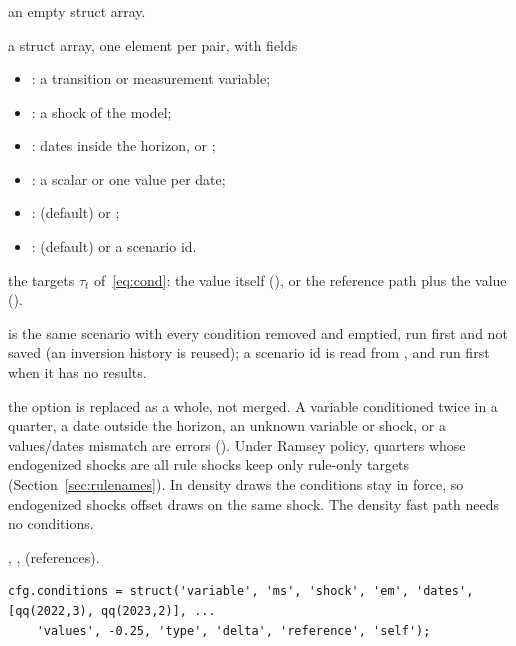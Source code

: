\documentclass[11pt,a4paper]{article}
\DeclareRobustCommand{\codem}[1]{\texttt{\detokenize{#1}}}
\newenvironment{optspec}%
  {\begin{description}[style=sameline,leftmargin=2.7cm,labelwidth=2.5cm,font=\normalfont\itshape]}%
  {\end{description}}
\begin{document}
\subsubsection{\texorpdfstring{\codem{conditions}}{conditions}}\label{opt:conditions}
\begin{optspec}
  \item[Default] an empty struct array.
  \item[Values] a struct array, one element per pair, with fields
        \begin{itemize}[nosep]
          \item {}: a transition or measurement variable;
          \item {}: a shock of the model;
          \item {}: dates inside the horizon, or ;
          \item {}: a scalar or one value per date;
          \item {}:  (default) or ;
          \item {}:  (default) or a scenario id.
        \end{itemize}
  \item[Math] the targets $\tau_t$ of~\eqref{eq:cond}: the value itself (), or
        the reference path plus the value ().
  \item[Assumptions]  is the same scenario with every condition removed and
         emptied, run first and not saved (an inversion history is reused);
        a scenario id is read from , and run first when it has
        no results.
  \item[Interactions] the option is replaced as a whole, not merged. A variable conditioned twice
        in a quarter, a date outside the horizon, an unknown variable or shock, or a values/dates
        mismatch are errors (). Under Ramsey policy, quarters
        whose endogenized shocks are all rule shocks keep only rule-only targets
        (Section~\ref{sec:rulenames}). In density draws the conditions stay in force, so
        endogenized shocks offset draws on the same shock. The density fast path needs no
        conditions.
  \item[Code] , ,
         (references).
  \item[Example]
\begin{lstlisting}
cfg.conditions = struct('variable', 'ms', 'shock', 'em', 'dates', [qq(2022,3), qq(2023,2)], ...
    'values', -0.25, 'type', 'delta', 'reference', 'self');
\end{lstlisting}
\end{optspec}
\end{document}
